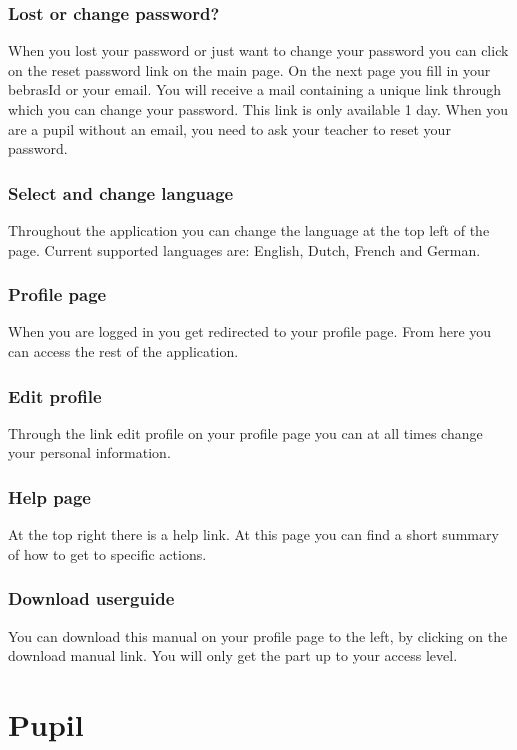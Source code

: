 \documentclass[11pt,a4paper]{report}
\begin{document}
\subsection{Lost or change password?}
When you lost your password or just want to change your password you can click on the reset password link on the main page. On the next page you fill in your bebrasId or your email. You will receive a mail containing a unique link through which you can change your password. This link is only available 1 day. When you are a pupil without an email, you need to ask your teacher to reset your password.

\subsection{Select and change language}
Throughout the application you can change the language at the top left of the page. Current supported languages are: English, Dutch, French and German.

\subsection{Profile page}
When you are logged in you get redirected to your profile page. From here you can access the rest of the application.

\subsection{Edit profile}
Through the link edit profile on your profile page you can at all times change your personal information.  

\subsection{Help page}
At the top right there is a help link. At this page you can find a short summary of how to get to specific actions. 
\subsection{Download userguide}
You can download this manual on your profile page to the left, by clicking on the download manual link. You will only get the part up to your access level.


\chapter{Pupil}
\end{document}
